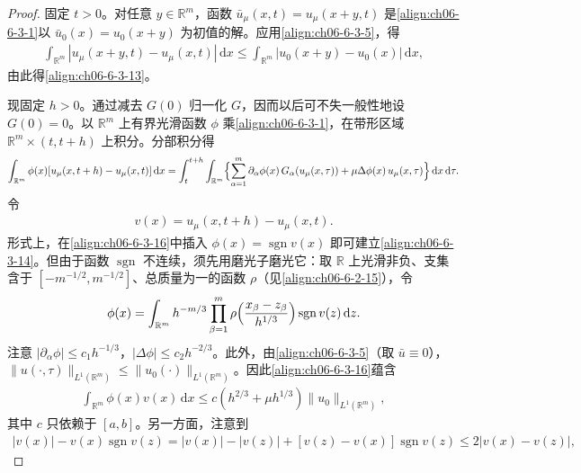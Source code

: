 \documentclass[../../main.tex]{subfiles}
\begin{document}
\begin{proof}
固定 $t>0$。对任意 $y\in\mathbb{R}^{m}$，函数 $\bar{u}_{\mu}(x,t)=u_{\mu}(x+y,t)$ 是\eqref{align:ch06-6-3-1}以 $\bar{u}_{0}(x)=u_{0}(x+y)$ 为初值的解。应用\eqref{align:ch06-6-3-5}，得
\begin{align}
\int_{\mathbb{R}^{m}}|u_{\mu}(x+y,t)-u_{\mu}(x,t)|\,\mathrm{d}x\leqslant\int_{\mathbb{R}^{m}}|u_{0}(x+y)-u_{0}(x)|\,\mathrm{d}x,
\label{align:ch06-6-3-15}
\end{align}
由此得\eqref{align:ch06-6-3-13}。

现固定 $h>0$。通过减去 $G(0)$ 归一化 $G$，因而以后可不失一般性地设 $G(0)=0$。以 $\mathbb{R}^{m}$ 上有界光滑函数 $\phi$ 乘\eqref{align:ch06-6-3-1}，在带形区域 $\mathbb{R}^{m}\times(t,t+h)$ 上积分。分部积分得
\begin{align}
\int_{\mathbb{R}^{m}}\phi(x)[u_{\mu}(x,t+h)-u_{\mu}(x,t)]\,\mathrm{d}x
=\int_{t}^{t+h}\int_{\mathbb{R}^{m}}\Bigl{\{}\sum_{\alpha=1}^{m}\partial_{\alpha}\phi(x)\,G_{\alpha}(u_{\mu}(x,\tau))+\mu\Delta\phi(x)\,u_{\mu}(x,\tau)\Bigr{\}}\,\mathrm{d}x\,\mathrm{d}\tau.
\label{align:ch06-6-3-16}
\end{align}
令
\begin{align}
v(x)=u_{\mu}(x,t+h)-u_{\mu}(x,t).
\label{align:ch06-6-3-17}
\end{align}
形式上，在\eqref{align:ch06-6-3-16}中插入 $\phi(x)=\operatorname{sgn}v(x)$ 即可建立\eqref{align:ch06-6-3-14}。但由于函数 $\operatorname{sgn}$ 不连续，须先用磨光子磨光它：取 $\mathbb{R}$ 上光滑非负、支集含于 $[-m^{-1/2},m^{-1/2}]$、总质量为一的函数 $\rho$（见\eqref{align:ch06-6-2-15}），令
\begin{align}
\phi(x)=\int_{\mathbb{R}^{m}}h^{-m/3}\prod_{\beta=1}^{m}\rho\Bigl{(}\frac{x_{\beta}-z_{\beta}}{h^{1/3}}\Bigr{)}\operatorname{sgn}v(z)\,\mathrm{d}z.
\label{align:ch06-6-3-18}
\end{align}
注意 $|\partial_{\alpha}\phi|\leqslant c_{1}h^{-1/3}$，$|\Delta\phi|\leqslant c_{2}h^{-2/3}$。此外，由\eqref{align:ch06-6-3-5}（取 $\bar{u}\equiv 0$），$\|u(\cdot,\tau)\|_{L^{1}(\mathbb{R}^{m})}\leqslant\|u_{0}(\cdot)\|_{L^{1}(\mathbb{R}^{m})}$。因此\eqref{align:ch06-6-3-16}蕴含
\begin{align}
\int_{\mathbb{R}^{m}}\phi(x)v(x)\,\mathrm{d}x\leqslant c(h^{2/3}+\mu h^{1/3})\|u_{0}\|_{L^{1}(\mathbb{R}^{m})},
\label{align:ch06-6-3-19}
\end{align}
其中 $c$ 只依赖于 $[a,b]$。另一方面，注意到
\begin{align}
|v(x)|-v(x)\operatorname{sgn}v(z)=|v(x)|-|v(z)|+[v(z)-v(x)]\operatorname{sgn}v(z)\leqslant 2|v(x)-v(z)|,

\end{align}
\end{proof}
\end{document}
